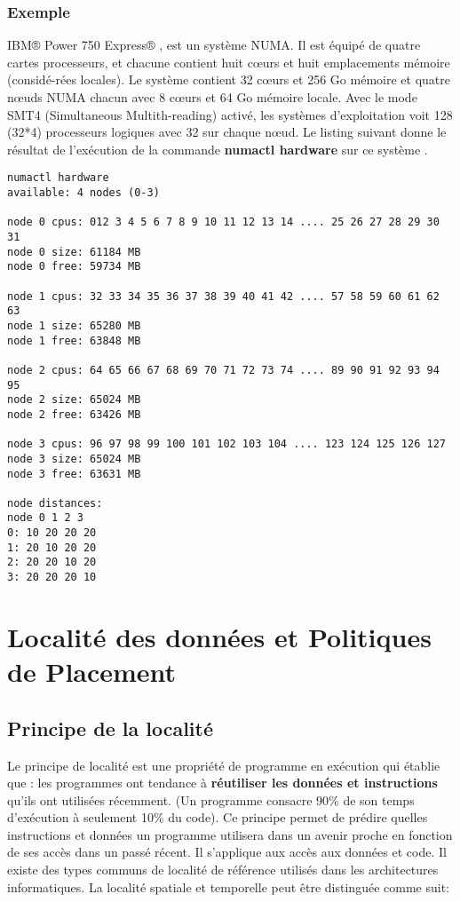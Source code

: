\subsubsection{Exemple}
%
IBM® Power 750 Express® \cite{IBM13} , est un système NUMA. Il est équipé de quatre cartes processeurs, et chacune contient huit cœurs et huit emplacements mémoire (considé-rées locales). Le système contient 32 cœurs et 256 Go mémoire et quatre nœuds NUMA chacun avec 8 cœurs et 64 Go mémoire locale. 
Avec le mode SMT4 (Simultaneous Multith-reading) activé, les systèmes d'exploitation voit 128 (32*4) processeurs logiques avec 32 sur chaque nœud.
Le listing suivant donne le résultat de l'exécution de la commande \textbf{numactl hardware} \cite{Linux13} sur ce système .
%
\begin{Verbatim}[formatcom=\color{blue}]
numactl hardware
available: 4 nodes (0-3)

node 0 cpus: 012 3 4 5 6 7 8 9 10 11 12 13 14 .... 25 26 27 28 29 30 31
node 0 size: 61184 MB
node 0 free: 59734 MB

node 1 cpus: 32 33 34 35 36 37 38 39 40 41 42 .... 57 58 59 60 61 62 63
node 1 size: 65280 MB
node 1 free: 63848 MB

node 2 cpus: 64 65 66 67 68 69 70 71 72 73 74 .... 89 90 91 92 93 94 95
node 2 size: 65024 MB
node 2 free: 63426 MB

node 3 cpus: 96 97 98 99 100 101 102 103 104 .... 123 124 125 126 127
node 3 size: 65024 MB
node 3 free: 63631 MB

node distances:
node 0 1 2 3
0: 10 20 20 20
1: 20 10 20 20
2: 20 20 10 20
3: 20 20 20 10
\end{Verbatim}
%
%
%
\section{Localité des données et Politiques de Placement}
%
\subsection{Principe de la localité}
%
Le principe de localité est une propriété de programme en exécution qui établie que : 
les programmes ont tendance à \textbf{réutiliser les données et instructions} qu'ils ont utilisées récemment. 
(Un programme consacre 90\% de son temps d'exécution à seulement 10\% du code). 
Ce principe permet de prédire quelles instructions et données un programme utilisera dans un avenir proche en fonction de ses accès dans un passé récent. 
Il s'applique aux accès aux données et code. Il existe des types communs de localité de référence utilisés dans les architectures informatiques. 
La localité spatiale et temporelle peut être distinguée comme suit:
%
